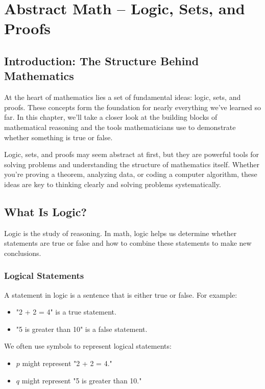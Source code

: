 
\chapter{Abstract Math – Logic, Sets, and Proofs}

\section{Introduction: The Structure Behind Mathematics}
At the heart of mathematics lies a set of fundamental ideas: logic, sets, and proofs. These concepts form the foundation for nearly everything we’ve learned so far. In this chapter, we’ll take a closer look at the building blocks of mathematical reasoning and the tools mathematicians use to demonstrate whether something is true or false.

Logic, sets, and proofs may seem abstract at first, but they are powerful tools for solving problems and understanding the structure of mathematics itself. Whether you're proving a theorem, analyzing data, or coding a computer algorithm, these ideas are key to thinking clearly and solving problems systematically.

\section{What Is Logic?}
Logic is the study of reasoning. In math, logic helps us determine whether statements are true or false and how to combine these statements to make new conclusions.

\subsection{Logical Statements}
A statement in logic is a sentence that is either true or false. For example:
\begin{itemize}
    \item "2 + 2 = 4" is a true statement.
    \item "5 is greater than 10" is a false statement.
\end{itemize}
We often use symbols to represent logical statements:
\begin{itemize}
    \item \( p \) might represent "2 + 2 = 4."
    \item \( q \) might represent "5 is greater than 10."
\end{itemize}


